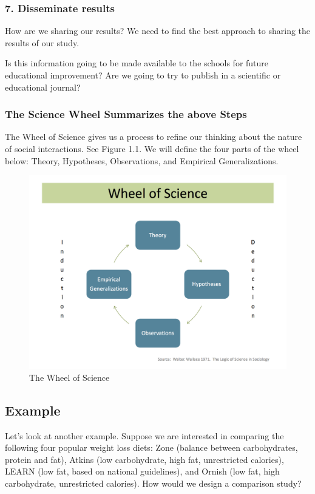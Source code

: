 \documentclass[11pt, chapterprefix=true]{scrbook}\usepackage[]{graphicx}\usepackage[]{color}
\begin{document}
\subsubsection{7. Disseminate results}

How are we sharing our results?  We need to find the best approach to sharing the results of our study.

Is this information going to be made available to the schools for future educational improvement?  Are we going to try to publish in a scientific or educational journal?


\subsubsection{The Science Wheel Summarizes the above Steps}

The Wheel of Science  \citep{Wallace1971}
gives us a process to refine our thinking about the nature of social interactions.  See Figure 1.1.  We will define the four parts of the wheel below:  Theory, Hypotheses, Observations, and Empirical Generalizations.

\begin{figure}[htbp]
   \centering

\includegraphics[width=0.45\linewidth]{chapters/Chapter_1/ext_figure/zWheel_Science.png} %

   \caption{The Wheel of Science}
   \label{fig:WS}
\end{figure}

\subsection{Example}

Let's look at another example.  Suppose we are interested in comparing the following four popular weight loss diets: Zone (balance between carbohydrates, protein and fat), Atkins (low carbohydrate, high fat, unrestricted calories), LEARN (low fat, based on national guidelines), and Ornish (low fat, high carbohydrate, unrestricted calories).   How would we design a comparison study?
\end{document}
